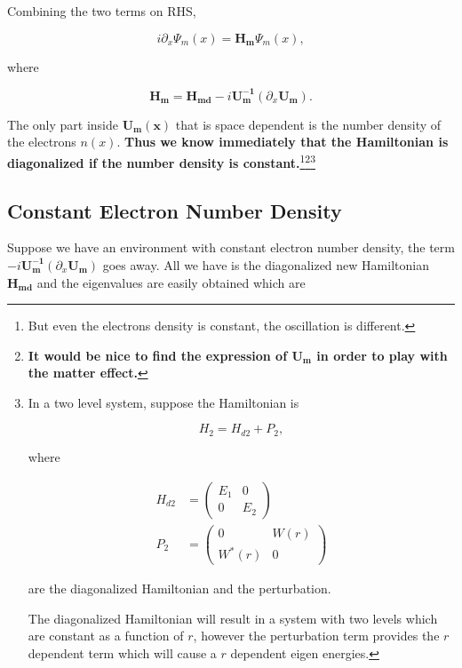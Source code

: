 \documentclass{tufte-handout}
\begin{document}
Combining the two terms on RHS,

\begin{equation*}
i\partial_x \Psi_m(x) = \mathbf{H_m} \Psi_m(x),
\end{equation*}

where

\begin{equation*}
\mathbf{H_m} = \mathbf{H_{md}} - i \mathbf{U_m^{-1}} ( \partial_x \mathbf{U_m} ).
\end{equation*}

The only part inside $\mathbf{U_m(x)}$ that is space dependent is the number density of the electrons $n(x)$. {\bf{Thus we know immediately that the Hamiltonian is diagonalized if the number density is constant.}}\footnote{But even the electrons density is constant, the oscillation is different.}\footnote{\bf It would be nice to find the expression of $\mathbf{U_m}$ in order to play with the matter effect.}\footnote{In a two level system, suppose the Hamiltonian is

\begin{equation*}
H_2 = H_{d2} + P_{2},
\end{equation*}

where 

\begin{align*}
H_{d2} & = \begin{pmatrix}
E_1 & 0 \\
0 & E_2
\end{pmatrix} \\
P_{2} & = \begin{pmatrix}
0 & W(r) \\
W^*(r) & 0 
\end{pmatrix}
\end{align*}

are the diagonalized Hamiltonian and the perturbation.

The diagonalized Hamiltonian will result in a system with two levels which are constant as a function of $r$, however the perturbation term provides the $r$ dependent term which will cause a $r$ dependent eigen energies.
}



\subsection{Constant Electron Number Density}

Suppose we have an environment with constant electron number density, the term $- i \mathbf{U_m^{-1}} ( \partial_x \mathbf{U_m} )$ goes away. All we have is the diagonalized new Hamiltonian $\mathbf{H_{md}}$ and the eigenvalues are easily obtained which are
\end{document}
